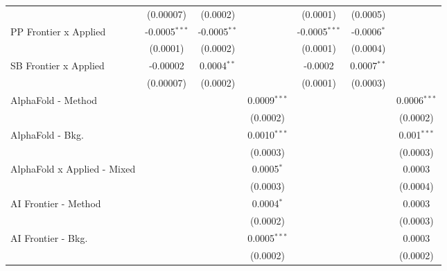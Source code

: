 \begin{tabular}{lcccccc}
                                  & (0.00007)       & (0.0002)        &                 & (0.0001)        & (0.0005)       &   \\   
   PP Frontier x Applied          & -0.0005$^{***}$ & -0.0005$^{**}$  &                 & -0.0005$^{***}$ & -0.0006$^{*}$  &   \\   
                                  & (0.0001)        & (0.0002)        &                 & (0.0001)        & (0.0004)       &   \\   
   SB Frontier x Applied          & -0.00002        & 0.0004$^{**}$   &                 & -0.0002         & 0.0007$^{**}$  &   \\   
                                  & (0.00007)       & (0.0002)        &                 & (0.0001)        & (0.0003)       &   \\   
   AlphaFold - Method             &                 &                 & 0.0009$^{***}$  &                 &                & 0.0006$^{***}$\\   
                                  &                 &                 & (0.0002)        &                 &                & (0.0002)\\   
   AlphaFold - Bkg.               &                 &                 & 0.0010$^{***}$  &                 &                & 0.001$^{***}$\\   
                                  &                 &                 & (0.0003)        &                 &                & (0.0003)\\   
   AlphaFold x Applied - Mixed    &                 &                 & 0.0005$^{*}$    &                 &                & 0.0003\\   
                                  &                 &                 & (0.0003)        &                 &                & (0.0004)\\   
   AI Frontier - Method           &                 &                 & 0.0004$^{*}$    &                 &                & 0.0003\\   
                                  &                 &                 & (0.0002)        &                 &                & (0.0003)\\   
   AI Frontier - Bkg.             &                 &                 & 0.0005$^{***}$  &                 &                & 0.0003\\   
                                  &                 &                 & (0.0002)        &                 &                & (0.0002)\\   

\end{tabular}
